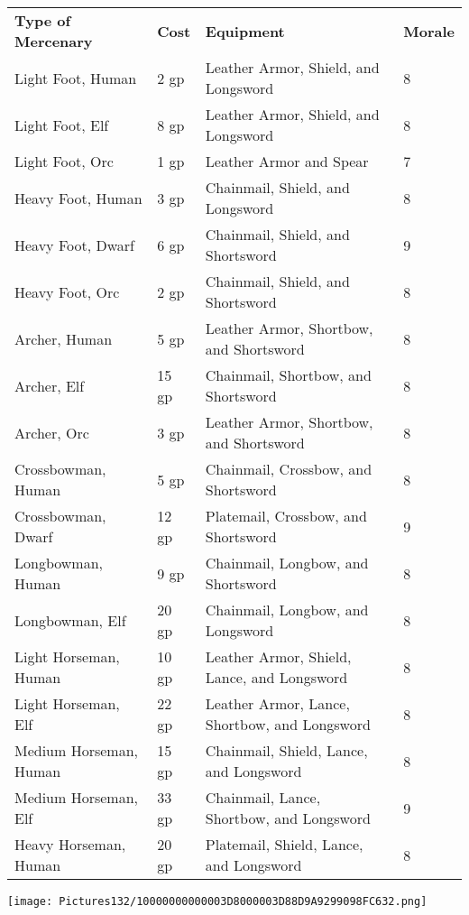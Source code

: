\documentclass[a4paper,twoside,openany,10pt]{book}
\begin{document}
\begin{tabular*}{0.93\linewidth}{@{\extracolsep{\fill}}llll}
\textbf{Type of Mercenary}&\textbf{Cost}&\textbf{Equipment}&\textbf{Morale}\\
Light Foot, Human&2 gp&Leather Armor, Shield, and Longsword&8\\\toprule
Light Foot, Elf&8 gp&Leather Armor, Shield, and Longsword&8\\\hline
Light Foot, Orc&1 gp&Leather Armor and Spear&7\\\hline
Heavy Foot, Human&3 gp&Chainmail, Shield, and Longsword&8\\\hline
Heavy Foot, Dwarf&6 gp&Chainmail, Shield, and Shortsword&9\\\hline
Heavy Foot, Orc&2 gp&Chainmail, Shield, and Shortsword&8\\\hline
Archer, Human&5 gp&Leather Armor, Shortbow, and Shortsword&8\\\hline
Archer, Elf&15 gp&Chainmail, Shortbow, and Shortsword&8\\\hline
Archer, Orc&3 gp&Leather Armor, Shortbow, and Shortsword&8\\\hline
Crossbowman, Human&5 gp&Chainmail, Crossbow, and Shortsword&8\\\hline
Crossbowman, Dwarf&12 gp&Platemail, Crossbow, and Shortsword&9\\\hline
Longbowman, Human&9 gp&Chainmail, Longbow, and Shortsword&8\\\hline
Longbowman, Elf&20 gp&Chainmail, Longbow, and Longsword&8\\\hline
Light Horseman, Human&10 gp&Leather Armor, Shield, Lance, and Longsword&8\\\hline
Light Horseman, Elf&22 gp&Leather Armor, Lance, Shortbow, and Longsword&8\\\hline
Medium Horseman, Human&15 gp&Chainmail, Shield, Lance, and Longsword&8\\\hline
Medium Horseman, Elf&33 gp&Chainmail, Lance, Shortbow, and Longsword&9\\\hline
Heavy Horseman, Human&20 gp&Platemail, Shield, Lance, and Longsword&8\\\hline
\end{tabular*}

\vfill

\begin{center}
	\texttt{[image: Pictures132/10000000000003D8000003D88D9A9299098FC632.png]}
\end{center}

\pagebreak
\end{document}
